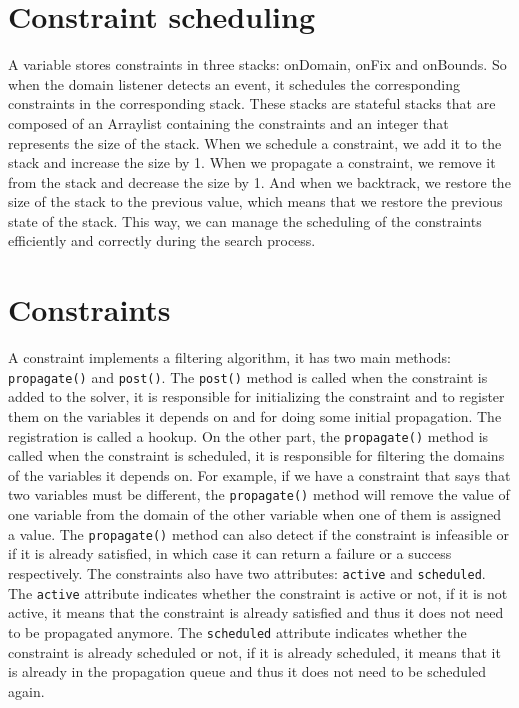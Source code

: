 \documentclass[12pt, openany]{report}
\theoremstyle{definition}
\begin{document}
\section{Constraint scheduling}
A variable stores constraints in three stacks: onDomain, onFix and onBounds. So when the domain listener detects an event, it schedules the corresponding constraints in the corresponding stack. These stacks are stateful stacks that are composed of an Arraylist containing the constraints and an integer that represents the size of the stack. When we schedule a constraint, we add it to the stack and increase the size by 1. When we propagate a constraint, we remove it from the stack and decrease the size by 1. And when we backtrack, we restore the size of the stack to the previous value, which means that we restore the previous state of the stack. This way, we can manage the scheduling of the constraints efficiently and correctly during the search process.
\section{Constraints}
A constraint implements a filtering algorithm, it has two main methods: \texttt{propagate()} and \texttt{post()}. The \texttt{post()} method is called when the constraint is added to the solver, it is responsible for initializing the constraint and to register them on the variables it depends on and for doing some initial propagation. The registration is called a hookup. On the other part, the \texttt{propagate()} method is called when the constraint is scheduled, it is responsible for filtering the domains of the variables it depends on. For example, if we have a constraint that says that two variables must be different, the \texttt{propagate()} method will remove the value of one variable from the domain of the other variable when one of them is assigned a value. The \texttt{propagate()} method can also detect if the constraint is infeasible or if it is already satisfied, in which case it can return a failure or a success respectively. The constraints also have two attributes: \texttt{active} and \texttt{scheduled}. The \texttt{active} attribute indicates whether the constraint is active or not, if it is not active, it means that the constraint is already satisfied and thus it does not need to be propagated anymore. The \texttt{scheduled} attribute indicates whether the constraint is already scheduled or not, if it is already scheduled, it means that it is already in the propagation queue and thus it does not need to be scheduled again.
\end{document}
